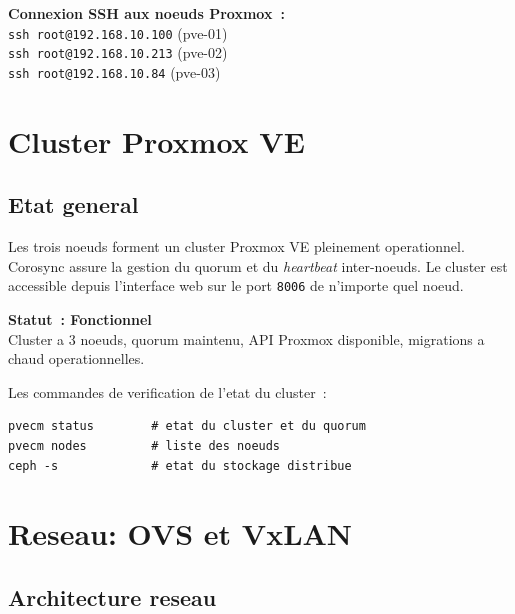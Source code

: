 \documentclass[a4paper,11pt]{article}
\newenvironment{infobox}{%
  \begin{mdframed}[linecolor=bleu,backgroundcolor=bleu!5,linewidth=1pt,
    leftmargin=0pt,rightmargin=0pt,innertopmargin=6pt,innerbottommargin=6pt]
}{%
  \end{mdframed}
}
\newenvironment{successbox}{%
  \begin{mdframed}[linecolor=vert,backgroundcolor=vert!7,linewidth=1pt,
    leftmargin=0pt,rightmargin=0pt,innertopmargin=6pt,innerbottommargin=6pt]
}{%
  \end{mdframed}
}
\begin{document}
\begin{infobox}
  \textbf{Connexion SSH aux noeuds Proxmox~:}\\
  \texttt{ssh root@192.168.10.100} \quad (pve-01)\\
  \texttt{ssh root@192.168.10.213} \quad (pve-02)\\
  \texttt{ssh root@192.168.10.84}  \quad (pve-03)
\end{infobox}

\section{Cluster Proxmox VE}

\subsection{Etat general}

Les trois noeuds forment un cluster Proxmox VE pleinement operationnel.
Corosync assure la gestion du quorum et du \textit{heartbeat} inter-noeuds.
Le cluster est accessible depuis l'interface web sur le port \texttt{8006}
de n'importe quel noeud.

\begin{successbox}
  \textbf{Statut~: Fonctionnel} \\
  Cluster a 3 noeuds, quorum maintenu, API Proxmox disponible, migrations a chaud operationnelles.
\end{successbox}

Les commandes de verification de l'etat du cluster~:

\begin{lstlisting}[style=shellstyle]
pvecm status        # etat du cluster et du quorum
pvecm nodes         # liste des noeuds
ceph -s             # etat du stockage distribue
\end{lstlisting}

\section{Reseau: OVS et VxLAN}

\subsection{Architecture reseau}
\end{document}
